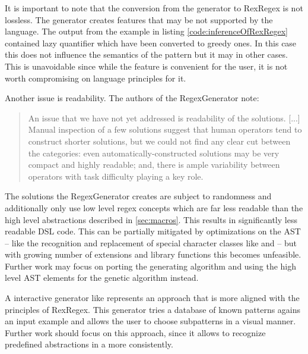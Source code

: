 It is important to note that the conversion from the generator to RexRegex is not lossless. The generator creates features that may be not supported by the language. The output from the example in listing \ref{code:inferenceOfRexRegex} contained lazy quantifier which have been converted to greedy ones. In this case this does not influence the semantics of the pattern but it may in other cases. This is unavoidable since while the feature is convenient for the user, it is not worth compromising on language principles for it.

Another issue is readability. The authors of the RegexGenerator note: 

\begin{quote}
An issue that we have not yet addressed is readability of the solutions. [...] Manual inspection of a few solutions suggest that human operators tend to construct shorter solutions, but we could not find any clear cut between the categories: even automatically-constructed solutions may be very compact and highly readable; and, there is ample variability between operators with task difficulty playing a key role. \cite{bartoli2016can}
\end{quote}

The solutions the RegexGenerator creates are subject to randomness and additionally only use low level regex concepts which are far less readable than the high level abstractions described in \ref{sec:macros}. This results in significantly less readable DSL code. This can be partially mitigated by optimizations on the AST -- like the recognition and replacement of special character classes like  and  -- but with growing number of extensions and library functions this becomes unfeasible. Further work may focus on porting the generating algorithm and using the high level AST elements for the genetic algorithm instead.

A interactive generator like \cite{noxoneRegexGenerator} represents an approach that is more aligned with the principles of RexRegex. This generator tries a database of known patterns agains an input example and allows the user to choose subpatterns in a visual manner. Further work should focus on this approach, since it allows to recognize predefined abstractions in a more consistently.



